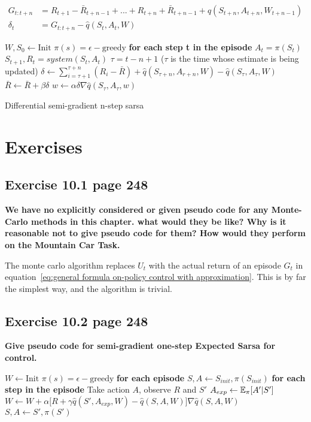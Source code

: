 \begin{equation}
\begin{split}
G_{t:t+n} & = R_{t+1} - \bar{R}_{t+n-1} + ... + R_{t+n} + \bar{R}_{t+n-1} + \hat{q}(S_{t+n}, A_{t+n}, W_{t+n-1}) \\
\delta_t & = G_{t:t+n} - \hat{q}(S_t, A_t, W)
\end{split}
\label{eq:n-step differential TD-error}
\end{equation}

\begin{algorithm}
\begin{algorithmic}
	\State $W, S_0 \gets \text{Init}$
	\State $\pi(s)=\epsilon - \text{greedy}$
	\Loop \space \textbf{for each step t in the episode}
	\State $A_t = \pi(S_t)$
	\State $S_{t+1}, R_t = system(S_t, A_t)$
	\State $\tau = t -n + 1$ ($\tau$ is the time whose estimate is being updated)
		\State $\delta \gets \sum_{i=\tau+1}^{\tau + n} (R_i - \bar{R}) + \hat{q}(S_{\tau + n}, A_{r+n}, W) - \hat{q}(S_{\tau}, A_{\tau}, W)$
		\State $\bar{R} \gets \bar{R} + \beta \delta$
		\State $w \gets \alpha \delta \nabla \hat{q}(S_{\tau}, A_{\tau}, w)$
	\EndIf
	\EndLoop
\end{algorithmic}
\label{alg:differential semi-gradient n-step sarsa}
\caption{Differential semi-gradient n-step sarsa}\end{algorithm}
\section{Exercises}

\subsection{Exercise 10.1 page 248}
\textbf{We have no explicitly considered or given pseudo code for any Monte-Carlo methods in this chapter. what would they be like? Why is it reasonable not to give pseudo code for them? How would they perform on the Mountain Car Task.}

The monte carlo algorithm replaces $U_t$ with the actual return of an episode $G_t$ in equation~\ref{eq:general formula on-policy control with approximation}. This is by far the simplest way, and the algorithm is trivial.

\subsection{Exercise 10.2 page 248}
\textbf{Give pseudo code for semi-gradient one-step Expected Sarsa for control.}
\begin{algorithmic}
\State $W \gets \text{Init}$
\State $\pi(s)=\epsilon - \text{greedy}$
\Loop \space \textbf{for each episode}
	\State $S, A \gets S_{init}, \pi(S_{init})$
	\Loop \space \textbf{for each step in the episode}
		\State Take action $A$, observe $R$ and $S'$
		\State $A_{exp} \gets \operatorname{\mathbb{E}}_{\pi}[A' | S']$
		\State $W \gets W + \alpha \big[R + \gamma\hat{q}(S', A_{exp}, W) - \hat{q}(S, A, W) \big] \nabla \hat{q}(S, A, W)$		
		\State $S, A \gets S', \pi(S')$
	\EndLoop
\EndLoop
\label{alg:approximated one step exptected SARSA}
\end{algorithmic}

